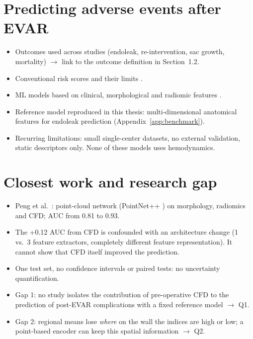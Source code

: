 \section{Predicting adverse events after EVAR}
\label{sec:prediction}
\begin{itemize}
    \item Outcomes used across studies (endoleak, re-intervention, sac growth, mortality) $\rightarrow$ link to the outcome definition in Section~1.2.
    \item Conventional risk scores and their limits \cite{lijftogt_systematic_2017}.
    \item ML models based on clinical, morphological and radiomic features \cite{braak_scoping_2026, karthikesalingam_artificial_2015, long_applying_2024, li_machine_2023}. 
    \item Reference model reproduced in this thesis: multi-dimensional anatomical features for endoleak prediction \cite{peng_predict_2024} (Appendix~\ref{app:benchmark}).
    \item Recurring limitations: small single-center datasets, no external validation, static descriptors only. None of these models uses hemodynamics.
\end{itemize}

\section{Closest work and research gap}
\label{sec:gap}
\begin{itemize}
    \item Peng et al.\ \cite{peng_endoleak_2026}: point-cloud network (PointNet++ \cite{qi_pointnet_2017}) on morphology, radiomics and CFD; AUC from 0.81 to 0.93.
    \item The +0.12 AUC from CFD is confounded with an architecture change (1 vs.\ 3 feature extractors, completely different feature representation). It cannot show that CFD itself improved the prediction.
    \item One test set, no confidence intervals or paired tests: no uncertainty quantification.
    \item Gap 1: no study isolates the contribution of pre-operative CFD to the prediction of post-EVAR complications with a fixed reference model $\rightarrow$ Q1.
    \item Gap 2: regional means lose \emph{where} on the wall the indices are high or low; a point-based encoder can keep this spatial information \cite{qi_pointnet_2017} $\rightarrow$ Q2.
\end{itemize}

